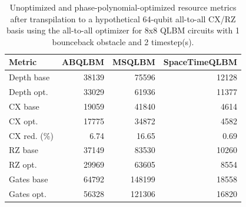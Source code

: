 \begin{table}[ht]
\centering
\begin{tabular}{lrrr}
\hline
Metric & ABQLBM & MSQLBM & SpaceTimeQLBM \\
\hline
Depth base & 38139 & 75596 & 12128 \\
Depth opt. & 33029 & 61936 & 11377 \\
CX base & 19059 & 41840 & 4614 \\
CX opt. & 17775 & 34872 & 4582 \\
CX red. (\%) & 6.74 & 16.65 & 0.69 \\
RZ base & 37149 & 83530 & 10260 \\
RZ opt. & 29969 & 63605 & 8554 \\
Gates base & 64792 & 148199 & 18558 \\
Gates opt. & 56328 & 121306 & 16820 \\
\hline
\end{tabular}
\caption{Unoptimized and phase-polynomial-optimized resource metrics after transpilation to a hypothetical 64-qubit all-to-all CX/RZ basis using the all-to-all optimizer for 8x8 QLBM circuits with 1 bounceback obstacle and 2 timestep(s).}
\label{tab:phase-poly-optimization-comparison-8x8-obs1-t2-all-to-all}
\end{table}
